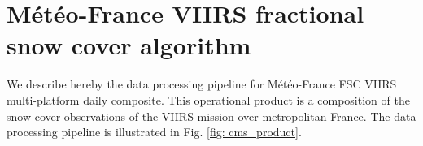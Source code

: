 \documentclass[tc, manuscript]{copernicus}
\begin{document}



\clearpage 

\appendix
\section{Météo-France VIIRS fractional snow cover algorithm}
\label{app: mf_product}

We describe hereby the data processing pipeline for Météo-France FSC VIIRS multi-platform daily composite. This operational product is a composition of the snow cover observations of the VIIRS mission over metropolitan France. The data processing pipeline is illustrated in Fig. \ref{fig: cms_product}.
\end{document}
